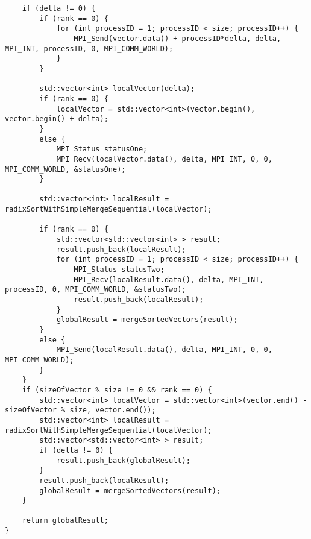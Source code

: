 \documentclass[a4paper, 14pt]{article}
\theoremstyle{plain}
\begin{document}
\begin{verbatim}
	if (delta != 0) {
		if (rank == 0) {
			for (int processID = 1; processID < size; processID++) {
				MPI_Send(vector.data() + processID*delta, delta, MPI_INT, processID, 0, MPI_COMM_WORLD);
			}
		}
		
		std::vector<int> localVector(delta);
		if (rank == 0) {
			localVector = std::vector<int>(vector.begin(), vector.begin() + delta);
		}
		else {
			MPI_Status statusOne;
			MPI_Recv(localVector.data(), delta, MPI_INT, 0, 0, MPI_COMM_WORLD, &statusOne);
		}
		
		std::vector<int> localResult = radixSortWithSimpleMergeSequential(localVector);
		
		if (rank == 0) {
			std::vector<std::vector<int> > result;
			result.push_back(localResult);
			for (int processID = 1; processID < size; processID++) {
				MPI_Status statusTwo;
				MPI_Recv(localResult.data(), delta, MPI_INT, processID, 0, MPI_COMM_WORLD, &statusTwo);
				result.push_back(localResult);
			}
			globalResult = mergeSortedVectors(result);
		}
		else {
			MPI_Send(localResult.data(), delta, MPI_INT, 0, 0, MPI_COMM_WORLD);
		}
	}
	if (sizeOfVector % size != 0 && rank == 0) {
		std::vector<int> localVector = std::vector<int>(vector.end() - sizeOfVector % size, vector.end());
		std::vector<int> localResult = radixSortWithSimpleMergeSequential(localVector);
		std::vector<std::vector<int> > result;
		if (delta != 0) {
			result.push_back(globalResult);
		}
		result.push_back(localResult);
		globalResult = mergeSortedVectors(result);
	}
	
	return globalResult;
}
\end{verbatim}
\end{document}
